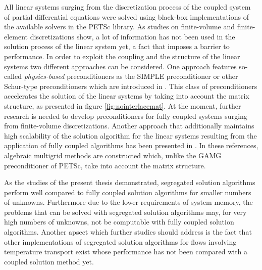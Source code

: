 All linear systems surging from the discretization process of the coupled system of partial differential equations were solved using black-box implementations of the available solvers in the PETSc library. As studies on finite-volume \cite{klaij13,darwish09,mangani14} and finite-element \cite{brown12,elman03,elman08,silvester01,turek02,mcinnes14} discretizations show, a lot of information has not been used in the solution process of the linear system yet, a fact that imposes a barrier to performance. In order to exploit the coupling and the structure of the linear systems two different approaches can be considered. One approach features so-called \emph{physics-based} preconditioners as the SIMPLE preconditioner or other Schur-type preconditioners which are introduced in \cite{klaij13,elman08}. This class of preconditioners accelerates the solution of the linear systems by taking into account the matrix structure, as presented in figure \ref{fig:nointerlacemat}. At the moment, further research is needed to develop preconditioners for fully coupled systems surging from finite-volume discretizations. Another approach that additionally maintains high scalability of the solution algorithm for the linear systems resulting from the application of fully coupled algorithms has been presented in \cite{darwish09,mangani14}. In these references, algebraic multigrid methods are constructed which, unlike the GAMG preconditioner of PETSc, take into account the matrix structure.

As the studies of the present thesis demonstrated, segregated solution algorithms perform well compared to fully coupled solution algorithms for smaller numbers of unknowns. Furthermore due to the lower requirements of system memory, the problems that can be solved with segregated solution algorithms may, for very high numbers of unknowns, not be computable with fully coupled solution algorithms. Another apsect which further studies should address is the fact that other implementations of segregated solution algorithms for flows involving temperature transport exist \cite{liu84,oliveira01} whose performance has not been compared with a coupled solution method yet.

